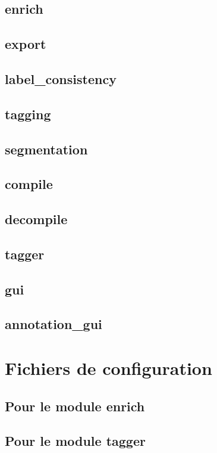 \documentclass[12pt]{article}
\begin{document}
        \subsection{enrich}
        

        \subsection{export}
        

        \subsection{label\_consistency}
        

        \subsection{tagging}
        

        \subsection{segmentation}
        

        \subsection{compile}
        

        \subsection{decompile}
        

        \subsection{tagger}
        

        \subsection{gui}
        

        \subsection{annotation\_gui}
        
    
    \section{Fichiers de configuration}

        \subsection{Pour le module enrich}
        

        \subsection{Pour le module tagger}
        
    
    
    
\end{document}
